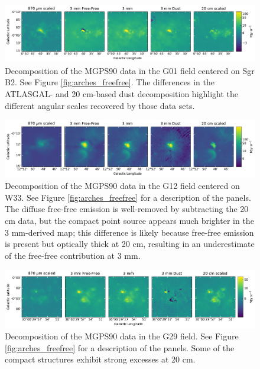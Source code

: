 \documentclass[twocolumn]{aastex62}
\begin{document}
\begin{figure}[htp]
    \includegraphics[width=17cm]{figures/G01_sgrb2_5panel.pdf}
    \caption{Decomposition of the MGPS90 data in the G01 field centered on Sgr B2.
    See Figure \ref{fig:arches_freefree}.
    The differences in the ATLASGAL- and 20 cm-based dust decomposition highlight the
    different angular scales recovered by those data sets.
}
\label{fig:sgrb2freefree}
\end{figure}

\begin{figure}[htp]
    \includegraphics[width=17cm]{figures/G12_w33_5panel.pdf}
    \caption{Decomposition of the MGPS90 data in the G12 field centered on W33.
    See Figure \ref{fig:arches_freefree} for a description of the panels.
    The diffuse free-free emission is well-removed by subtracting the 20 cm data,
    but the compact point source appears much brighter in the 3 mm-derived map;
    this difference is likely because free-free emission is present but optically
    thick at 20 cm, resulting in an underestimate of the free-free contribution 
    at 3 mm.
}
\label{fig:w33freefree}
\end{figure}

\begin{figure}[htp]
    \includegraphics[width=17cm]{figures/G29_g29_5panel.pdf}
    \caption{Decomposition of the MGPS90 data in the G29 field.
    See Figure \ref{fig:arches_freefree} for a description of the panels.
    Some of the compact structures exhibit strong excesses at 20 cm.
}
\label{fig:g29freefree}
\end{figure}
\end{document}
